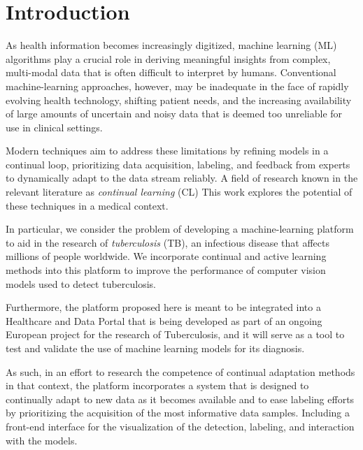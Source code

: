 \documentclass[../main.tex]{subfiles}
\begin{document}
\chapter{Introduction}
\label{chap:intro}

 As health information becomes increasingly digitized, machine learning (ML) algorithms play a crucial role in deriving meaningful insights from complex, multi-modal data that is often difficult to interpret by humans. 
 Conventional machine-learning approaches, however, may be inadequate in the face of rapidly evolving health technology, shifting patient needs, and the increasing availability of large amounts of uncertain and noisy data that is deemed too unreliable for use in clinical settings.

 Modern techniques aim to address these limitations by refining models in a continual loop, prioritizing data acquisition, labeling, and feedback from experts to dynamically adapt to the data stream reliably. A field of research known in the relevant literature as \textit{continual learning} (CL) \cite{parisi_continual_2019} This work explores the potential of these techniques in a medical context. 
 
 In particular, we consider the problem of developing a machine-learning platform to aid in the research of \textit{tuberculosis} (TB), an infectious disease that affects millions of people worldwide. We incorporate continual and active learning methods into this platform to improve the performance of computer vision models used to detect tuberculosis.
 
 Furthermore, the platform proposed here is meant to be integrated into a Healthcare and Data Portal that is being developed as part of an ongoing European project for the research of Tuberculosis, and it will serve as a tool to test and validate the use of machine learning models for its diagnosis. 

 As such, in an effort to research the competence of continual adaptation methods in that context, the platform incorporates a system that is designed to continually adapt to new data as it becomes available and to ease labeling efforts by prioritizing the acquisition of the most informative data samples. Including a front-end interface for the visualization of the detection, labeling, and interaction with the models.
 
\end{document}
